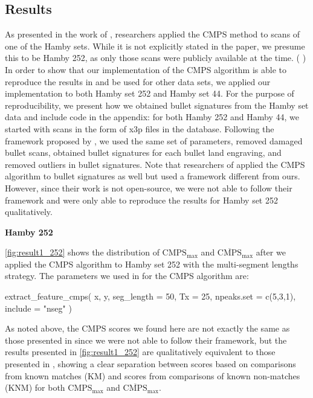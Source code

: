 \hypertarget{results}{%
\subsection{Results}\label{results}}

As presented in the work of \citet{cmps}, researchers applied the CMPS
method to scans of one of the Hamby sets. While it is not explicitly
stated in the paper, we presume this to be Hamby 252, as only those
scans were publicly available at the time.
(
\citet{cmps}) In order
to show that our implementation of the CMPS algorithm is able to
reproduce the results in \citet{cmps} and be used for other data sets,
we applied our implementation to both Hamby set 252 and Hamby set 44.
For the purpose of reproducibility, we present how we obtained bullet
signatures from the Hamby set data and include code in the appendix: for
both Hamby 252 and Hamby 44, we started with scans in the form of x3p
files in the database. Following the framework proposed by \citet{aoas},
we used the same set of parameters, removed damaged bullet scans,
obtained bullet signatures for each bullet land engraving, and removed
outliers in bullet signatures. Note that researchers of \citet{cmps}
applied the CMPS algorithm to bullet signatures as well but used a
framework different from ours. However, since their work is not
open-source, we were not able to follow their framework and were only
able to reproduce the results for Hamby set 252 qualitatively.

\textbf{Hamby 252}

\autoref{fig:result1_252} shows the distribution of
\(\mathrm{CMPS_{max}}\) and \(\mathrm{\overline{CMPS}_{max}}\) after we
applied the CMPS algorithm to Hamby set 252 with the multi-segment
lengths strategy. The parameters we used in
 for the CMPS algorithm are:

\begin{Schunk}
\begin{Sinput}
extract_feature_cmps(
  x, y,
  seg_length = 50,
  Tx = 25,
  npeaks.set = c(5,3,1),
  include = "nseg"
)
\end{Sinput}
\end{Schunk}

As noted above, the CMPS scores we found here are not exactly the same
as those presented in \citet{cmps} since we were not able to follow
their framework, but the results presented in \autoref{fig:result1_252}
are qualitatively equivalent to those presented in \citet{cmps}, showing
a clear separation between scores based on comparisons from known
matches (KM) and scores from comparisons of known non-matches (KNM) for
both \(\mathrm{CMPS_{max}}\) and \(\mathrm{\overline{CMPS}_{max}}\).

